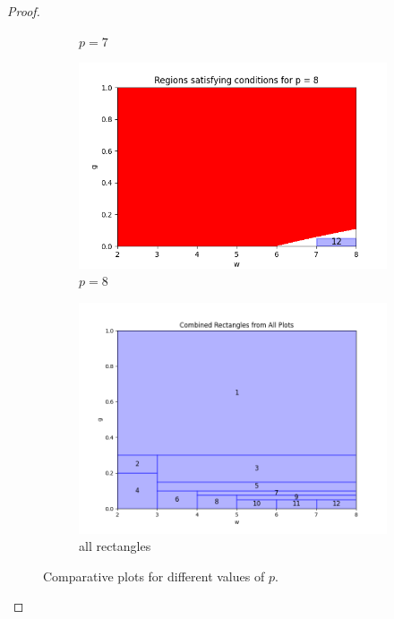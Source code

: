\documentclass{article}
\begin{document}
\begin{proof}
\begin{figure}[ht]
\begin{subfigure}{0.32\textwidth}
        \caption{$p = 7$}
    \end{subfigure}
    \hfill
    \begin{subfigure}{0.32\textwidth}
        \includegraphics[width=\linewidth]{plotsexcom/plot_p_8.png}
        \caption{$p = 8$}
    \end{subfigure}
    \begin{subfigure}{0.32\textwidth}
        \includegraphics[width=\linewidth]{plotsexcom/rectanglesall.png}
        \caption{all rectangles}
    \end{subfigure}
    \caption{Comparative plots for different values of $p$.}
    \label{fig:all_plots}
\end{figure}


\end{proof}
\end{document}
